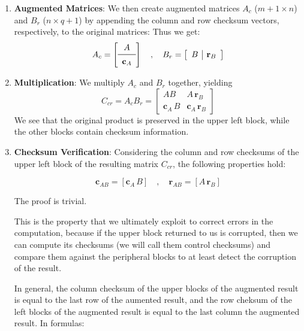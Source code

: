 \begin{enumerate}
  \item \textbf{Augmented Matrices}:
    We then create augmented matrices $A_{c}$ (\( m+1 \times n \)) and $B_{r}$ (\( n \times q+1 \))
    by appending the column and row checksum vectors, respectively, to the original matrices:
    Thus we get:
    \[
      A_{c} =
      \left[
        \begin{array}{c}
          A \\
          \midrule
          \mathbf{c}_A
        \end{array}
      \right]
      \quad
      ,
      \quad
      B_{r} = \left[
        \begin{array}{c|c}
          B &
          \mathbf{r}_B
        \end{array}
      \right]
    \]
  \item \textbf{Multiplication}: We multiply $ A_{c} $ and $ B_{r} $ together, yielding
    \[
      C_{cr} = A_{c} B_{r} = \left[
        \begin{array}{c|c}
          A B & A \, \mathbf{r}_B \\
          \hline
          \mathbf{c}_A \, B & \mathbf{c}_A \, \mathbf{r}_B
        \end{array}
      \right]
    \]
    We see that the original product is preserved
    in the upper left block,
    while the other blocks contain checksum information.

  \item \textbf{Checksum Verification}:
    Considering the column and row checksums of the upper left block of
    the resulting matrix \( C_{cr} \), the following properties hold:

    \[
      \mathbf{c}_{AB} = \left[\mathbf{c}_A \, B \right]
      \quad
      ,
      \quad
      \mathbf{r}_{AB} = \left[A \, \mathbf{r}_B \right]
    \]

    The proof is trivial.

    This is the property that we ultimately exploit to correct errors in the computation,
    because if the upper block returned to us is corrupted,
    then we can compute its checksums (we will call them control checksums)
    and compare them against the peripheral blocks to at least detect the corruption of the result.

    In general, the column checksum of the upper blocks of the augmented result
    is equal to the last row of the aumented result, and the row cheksum of the left blocks of the augmented result
    is equal to the last column the augmented result. In formulas:


\end{enumerate}
